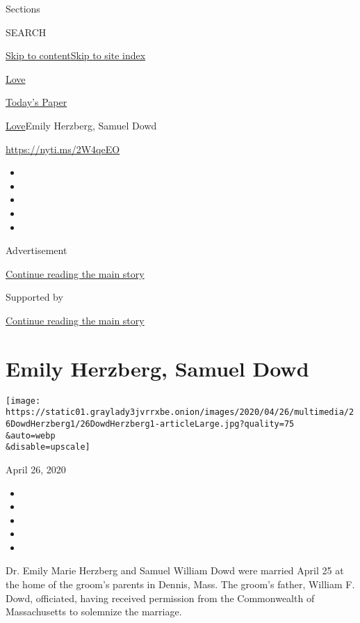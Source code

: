 Sections

SEARCH

\protect\hyperlink{site-content}{Skip to
content}\protect\hyperlink{site-index}{Skip to site index}

\href{https://www.nytimes3xbfgragh.onion/section/fashion/weddings}{Love}

\href{https://myaccount.nytimes3xbfgragh.onion/auth/login?response_type=cookie\&client_id=vi}{}

\href{https://www.nytimes3xbfgragh.onion/section/todayspaper}{Today's
Paper}

\href{/section/fashion/weddings}{Love}\textbar{}Emily Herzberg, Samuel
Dowd

\url{https://nyti.ms/2W4qeEO}

\begin{itemize}
\item
\item
\item
\item
\item
\end{itemize}

Advertisement

\protect\hyperlink{after-top}{Continue reading the main story}

Supported by

\protect\hyperlink{after-sponsor}{Continue reading the main story}

\hypertarget{emily-herzberg-samuel-dowd}{%
\section{Emily Herzberg, Samuel Dowd}\label{emily-herzberg-samuel-dowd}}

\texttt{[image: https://static01.graylady3jvrrxbe.onion/images/2020/04/26/multimedia/26DowdHerzberg1/26DowdHerzberg1-articleLarge.jpg?quality=75\\\&auto=webp\\\&disable=upscale]}

April 26, 2020

\begin{itemize}
\item
\item
\item
\item
\item
\end{itemize}

Dr. Emily Marie Herzberg and Samuel William Dowd were married April 25
at the home of the groom's parents in Dennis, Mass. The groom's father,
William F. Dowd, officiated, having received permission from the
Commonwealth of Massachusetts to solemnize the marriage.


